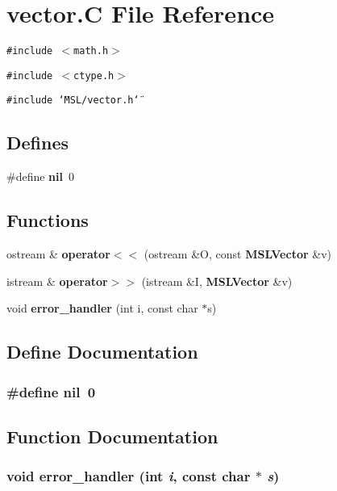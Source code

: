 \section{vector.C File Reference}
\label{vector_8C}
{\tt \#include $<$math.h$>$}\par
{\tt \#include $<$ctype.h$>$}\par
{\tt \#include \char`\"{}MSL/vector.h\char`\"{}}\par
\subsection*{Defines}
\begin{CompactItemize}
\item 
\#define {\bf nil}\ 0
\end{CompactItemize}
\subsection*{Functions}
\begin{CompactItemize}
\item 
ostream \& {\bf operator$<$$<$} (ostream \&O, const {\bf MSLVector} \&v)
\item 
istream \& {\bf operator$>$$>$} (istream \&I, {\bf MSLVector} \&v)
\item 
void {\bf error\_\-handler} (int i, const char $\ast$s)
\end{CompactItemize}


\subsection{Define Documentation}
\subsubsection{\setlength{\rightskip}{0pt plus 5cm}\#define nil\ 0}\label{vector_8C_a0}




\subsection{Function Documentation}
\subsubsection{\setlength{\rightskip}{0pt plus 5cm}void error\_\-handler (int {\em i}, const char $\ast$ {\em s})}\label{vector_8C_a3}


